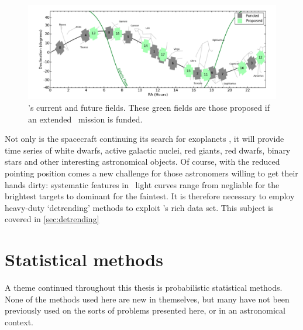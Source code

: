 \begin{figure}[p]
\begin{center}
\includegraphics[width=6in, clip=true]{figures/Future_K2_fields.pdf}
\caption[Future \ktwo\ fields]{\ktwo's current and future fields. These green
fields are those proposed if an extended \ktwo\ mission is funded.}
\label{fig:future_fields}
\end{center}
\end{figure}

Not only is the spacecraft continuing its search for exoplanets \citep[and has
already discovered many, \eg][]{Vanderburg2015, Crossfield2015,
Foreman-Mackey2015, Montet2015, Becker2015, Vanderburg2016}, it will
provide time series of white dwarfs, active galactic nuclei, red giants, red
dwarfs, binary stars and other interesting astronomical objects.
Of course, with the reduced pointing position comes a new challenge for those
astronomers willing to get their hands dirty: systematic features in \ktwo\
light curves range from negliable for the brightest targets to dominant for
the faintest.
It is therefore necessary to employ heavy-duty `detrending' methods to
exploit \ktwo's rich data set.
This subject is covered in \textsection \ref{sec:detrending}

\section{Statistical methods}

A theme continued throughout this thesis is probabilistic statistical methods.
None of the methods used here are new in themselves, but many have not been
previously used on the sorts of problems presented here, or in an astronomical
context.

